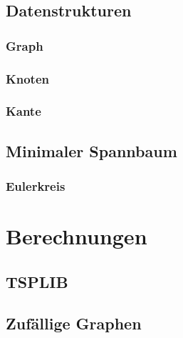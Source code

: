 \documentclass[a4paper]{article}
\begin{document}
\subsection{Datenstrukturen}
\subsubsection{Graph}
\subsubsection{Knoten}
\subsubsection{Kante}
\subsection{Minimaler Spannbaum}
\subsubsection{Eulerkreis}

\newpage

\section{Berechnungen}
\subsection{TSPLIB}
\subsection{Zufällige Graphen}

\newpage



\end{document}
